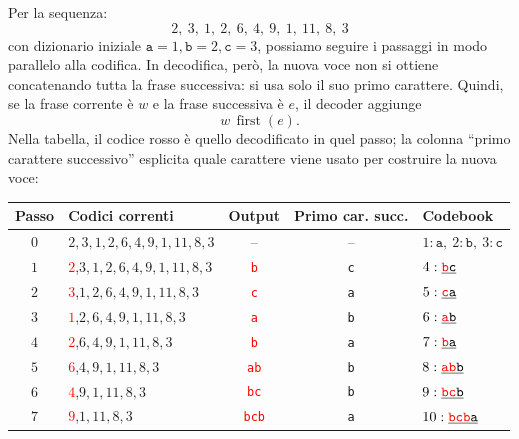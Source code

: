 \documentclass{article}
\theoremstyle{definition}
\numberwithin{equation}{section}
\begin{document}
Per la sequenza:
\[
    2,\ 3,\ 1,\ 2,\ 6,\ 4,\ 9,\ 1,\ 11,\ 8,\ 3
\]
con dizionario iniziale $\texttt{a}=1,\texttt{b}=2,\texttt{c}=3$, possiamo seguire i passaggi in modo parallelo alla codifica. In decodifica, però, la nuova voce non si ottiene concatenando tutta la frase successiva: si usa solo il suo primo carattere. Quindi, se la frase corrente è $w$ e la frase successiva è $e$, il decoder aggiunge
\[
    w\,\operatorname{first}(e).
\]
Nella tabella, il codice rosso è quello decodificato in quel passo; la colonna ``primo carattere successivo'' esplicita quale carattere viene usato per costruire la nuova voce:
\begin{table}[H]
    \centering
    \small
    \begin{tabular}{c|l|c|c|l}
        \textbf{Passo} & \textbf{Codici correnti}                    & \textbf{Output}               & \textbf{Primo car. succ.} & \textbf{Codebook}                                    \\ \hline
        $0$            & $2,3,1,2,6,4,9,1,11,8,3$                    & --                            & --                        & $1:\texttt{a},\ 2:\texttt{b},\ 3:\texttt{c}$         \\
        $1$            & \textcolor{red}{$2$},$3,1,2,6,4,9,1,11,8,3$ & \textcolor{red}{\texttt{b}}   & \texttt{c}                & $4:\uline{\textcolor{red}{\texttt{b}}\texttt{c}}$    \\
        $2$            & \textcolor{red}{$3$},$1,2,6,4,9,1,11,8,3$   & \textcolor{red}{\texttt{c}}   & \texttt{a}                & $5:\uline{\textcolor{red}{\texttt{c}}\texttt{a}}$    \\
        $3$            & \textcolor{red}{$1$},$2,6,4,9,1,11,8,3$     & \textcolor{red}{\texttt{a}}   & \texttt{b}                & $6:\uline{\textcolor{red}{\texttt{a}}\texttt{b}}$    \\
        $4$            & \textcolor{red}{$2$},$6,4,9,1,11,8,3$       & \textcolor{red}{\texttt{b}}   & \texttt{a}                & $7:\uline{\textcolor{red}{\texttt{b}}\texttt{a}}$    \\
        $5$            & \textcolor{red}{$6$},$4,9,1,11,8,3$         & \textcolor{red}{\texttt{ab}}  & \texttt{b}                & $8:\uline{\textcolor{red}{\texttt{ab}}\texttt{b}}$   \\
        $6$            & \textcolor{red}{$4$},$9,1,11,8,3$           & \textcolor{red}{\texttt{bc}}  & \texttt{b}                & $9:\uline{\textcolor{red}{\texttt{bc}}\texttt{b}}$   \\
        $7$            & \textcolor{red}{$9$},$1,11,8,3$             & \textcolor{red}{\texttt{bcb}} & \texttt{a}                & $10:\uline{\textcolor{red}{\texttt{bcb}}\texttt{a}}$ \\

\end{tabular}
\end{table}
\end{document}
